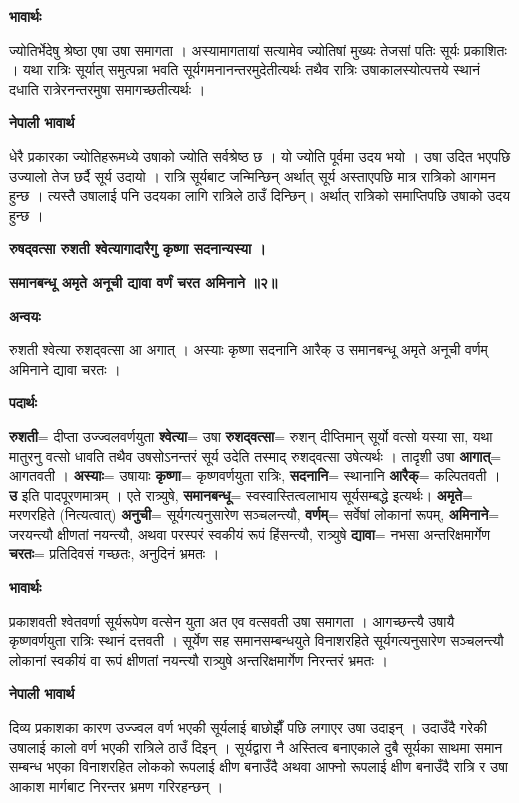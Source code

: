 \documentclass[11pt, a5paper]{article}
\begin{document}
\textbf{भावार्थः}

ज्योतिर्भेदेषु श्रेष्ठा एषा उषा समागता । अस्यामागतायां सत्यामेव ज्योतिषां मुख्यः तेजसां पतिः सूर्यः प्रकाशितः । यथा रात्रिः सूर्यात् समुत्पन्ना भवति सूर्यगमनानन्तरमुदेतीत्यर्थः तथैव रात्रिः उषाकालस्योत्पत्तये स्थानं दधाति रात्रेरनन्तरमुषा समागच्छतीत्यर्थः ।

\textbf{नेपाली भावार्थ}

धेरै प्रकारका ज्योतिहरूमध्ये उषाको ज्योति सर्वश्रेष्ठ छ । यो ज्योति पूर्वमा उदय भयो । उषा उदित भएपछि उज्यालो तेज छर्दै सूर्य उदायो । रात्रि सूर्यबाट जन्मिन्छिन् अर्थात् सूर्य अस्ताएपछि मात्र रात्रिको आगमन हुन्छ । त्यस्तै उषालाई पनि उदयका लागि रात्रिले ठाउँ दिन्छिन्। अर्थात् रात्रिको समाप्तिपछि उषाको उदय हुन्छ ।

\textbf{रुषद्‌वत्सा रुशती श्वेत्यागादारैगु कृष्णा सदनान्यस्या ।}

\textbf{समानबन्धू अमृते अनूची द्यावा वर्णं चरत अमिनाने ॥२॥}

\textbf{अन्वयः}

रुशती श्वेत्या रुशद्‌वत्सा आ अगात् । अस्याः कृष्णा सदनानि आरैक् उ समानबन्धू अमृते अनूची वर्णम् अमिनाने द्यावा चरतः ।

\textbf{पदार्थः}

\textbf{रुशती}= दीप्ता उज्ज्वलवर्णयुता \textbf{श्वेत्या}= उषा \textbf{रुशद्‌वत्सा}= रुशन् दीप्तिमान् सूर्यो वत्सो यस्या सा, यथा मातुरनु वत्सो धावति तथैव उषसोऽनन्तरं सूर्य उदेति तस्माद् रुशद्‌वत्सा उषेत्यर्थः । तादृशी उषा \textbf{आगात्}= आगतवती । \textbf{अस्याः}= उषायाः \textbf{कृष्णा}= कृष्णवर्णयुता रात्रिः, \textbf{सदनानि}= स्थानानि \textbf{आरैक्}= कल्पितवती । \textbf{उ} इति पादपूरणमात्रम् । एते रात्र्युषे, \textbf{समानबन्धू}= स्वस्वास्तित्वलाभाय सूर्यसम्बद्धे इत्यर्थः। \textbf{अमृते}= मरणरहिते (नित्यत्वात्) \textbf{अनुची}= सूर्यगत्यनुसारेण सञ्चलन्त्यौ, \textbf{वर्णम्}= सर्वेषां लोकानां रूपम्, \textbf{अमिनाने}= जरयन्त्यौ क्षीणतां नयन्त्यौ, अथवा परस्परं स्वकीयं रूपं हिंसन्त्यौ, रात्र्युषे \textbf{द्यावा}= नभसा अन्तरिक्षमार्गेण \textbf{चरतः}= प्रतिदिवसं गच्छतः, अनुदिनं भ्रमतः ।

\textbf{भावार्थः}

प्रकाशवती श्वेतवर्णा सूर्यरूपेण वत्सेन युता अत एव वत्सवती उषा समागता । आगच्छन्त्यै उषायै कृष्णवर्णयुता रात्रिः स्थानं दत्तवती । सूर्येण सह समानसम्बन्धयुते विनाशरहिते सूर्यगत्यनुसारेण सञ्चलन्त्यौ लोकानां स्वकीयं वा रूपं क्षीणतां नयन्त्यौ रात्र्युषे अन्तरिक्षमार्गेण निरन्तरं भ्रमतः ।

\textbf{नेपाली भावार्थ}

दिव्य प्रकाशका कारण उज्ज्वल वर्ण भएकी सूर्यलाई बाछोझैँ पछि लगाएर उषा उदाइन् । उदाउँदै गरेकी उषालाई कालो वर्ण भएकी रात्रिले ठाउँ दिइन् । सूर्यद्वारा नै अस्तित्व बनाएकाले दुबै सूर्यका साथमा समान सम्बन्ध भएका  विनाशरहित लोकको रूपलाई क्षीण बनाउँदै अथवा आफ्नो रूपलाई क्षीण बनाउँदै रात्रि र उषा आकाश मार्गबाट निरन्तर भ्रमण गरिरहन्छन् ।
\end{document}
